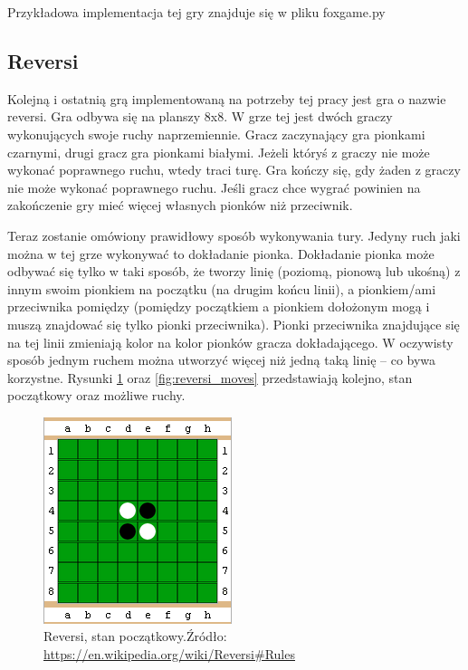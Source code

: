 \documentclass[polish,shortabstract,inz]{iithesis}
\begin{document}
Przykładowa implementacja tej gry znajduje się w pliku fox\textunderscore game.py

\subsection{Reversi}
Kolejną i ostatnią grą implementowaną na potrzeby tej pracy jest gra o nazwie reversi.
Gra odbywa się na planszy 8x8.
W grze tej jest dwóch graczy wykonujących swoje ruchy naprzemiennie.
Gracz zaczynający gra pionkami czarnymi, drugi gracz gra pionkami białymi.
Jeżeli któryś z graczy nie może wykonać poprawnego ruchu, wtedy traci turę.
Gra kończy się, gdy żaden z graczy nie może wykonać poprawnego ruchu.
Jeśli gracz chce wygrać powinien na zakończenie gry mieć więcej własnych pionków niż przeciwnik.

Teraz zostanie omówiony prawidłowy sposób wykonywania tury.
Jedyny ruch jaki można w tej grze wykonywać to dokładanie pionka.
Dokładanie pionka może odbywać się tylko w taki sposób, że tworzy linię (poziomą, pionową lub ukośną) z innym swoim pionkiem na początku (na drugim końcu linii), a pionkiem/ami przeciwnika pomiędzy (pomiędzy początkiem a pionkiem dołożonym mogą i muszą znajdować się tylko pionki przeciwnika).
Pionki przeciwnika znajdujące się na tej linii zmieniają kolor na kolor pionków gracza dokładającego.
W oczywisty sposób jednym ruchem można utworzyć więcej niż jedną taką linię -- co bywa korzystne.
Rysunki \ref{fig:reversi} oraz \ref{fig:reversi_moves} przedstawiają kolejno, stan początkowy oraz możliwe ruchy.
\begin{figure}[H]
  \includegraphics{./images/reversi.png}
  \centering
  \caption{Reversi, stan początkowy.\newline Źródło:\,\url{https://en.wikipedia.org/wiki/Reversi\#Rules}}
  \label{fig:reversi}
\end{figure}
\end{document}
